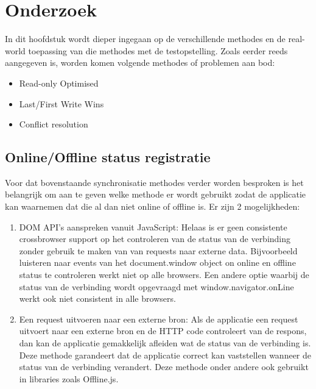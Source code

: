 
\chapter{Onderzoek}
\label{ch:onderzoek}

In dit hoofdstuk wordt dieper ingegaan op de verschillende methodes  en de real-world toepassing van die methodes met de testopstelling. Zoals eerder reeds aangegeven is, worden komen volgende methodes of problemen aan bod:
\begin{itemize}
\item Read-only Optimised
\item Last/First Write Wins
\item Conflict resolution
\end{itemize}

\section{Online/Offline status registratie}
Voor dat bovenstaande synchronisatie methodes verder worden besproken is het belangrijk om aan te geven welke methode er wordt gebruikt zodat de applicatie kan waarnemen dat die al dan niet online of offline is. Er zijn 2 mogelijkheden:
\begin{enumerate}
\item DOM API's aanspreken vanuit JavaScript: Helaas is er geen consistente crossbrowser support op het controleren van de status van de verbinding zonder gebruik te maken van van requests naar externe data. Bijvoorbeeld luisteren naar events van het document.window object on online en offline status te controleren werkt niet op alle browsers. Een andere optie waarbij de status van de verbinding wordt opgevraagd met window.navigator.onLine werkt ook niet consistent in alle browsers.
\item Een request uitvoeren naar een externe bron: Als de applicatie een request uitvoert naar een externe bron en de HTTP code controleert van de respons, dan kan de applicatie gemakkelijk afleiden wat de status van de verbinding is. Deze methode garandeert dat de applicatie correct kan vaststellen wanneer de status van de verbinding verandert. Deze methode onder andere ook gebruikt in libraries zoals Offline.js.
\end{enumerate}

